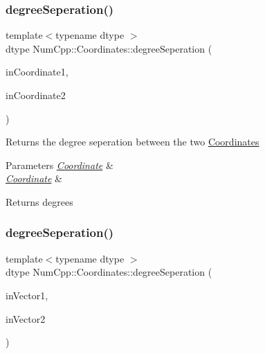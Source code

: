 \subsubsection{\texorpdfstring{degree\+Seperation()}{degreeSeperation()}\hspace{0.1cm}{\footnotesize\ttfamily [1/2]}}
{\footnotesize\ttfamily template$<$typename dtype $>$ \\
dtype Num\+Cpp\+::\+Coordinates\+::degree\+Seperation (\begin{DoxyParamCaption}\item[{const \mbox{\hyperlink{class_num_cpp_1_1_coordinates_1_1_coordinate}{Coordinate}}$<$ dtype $>$ \&}]{in\+Coordinate1,  }\item[{const \mbox{\hyperlink{class_num_cpp_1_1_coordinates_1_1_coordinate}{Coordinate}}$<$ dtype $>$ \&}]{in\+Coordinate2 }\end{DoxyParamCaption})}

Returns the degree seperation between the two \mbox{\hyperlink{namespace_num_cpp_1_1_coordinates}{Coordinates}}


\begin{DoxyParams}{Parameters}
{\em \mbox{\hyperlink{class_num_cpp_1_1_coordinates_1_1_coordinate}{Coordinate}}} & \\
\hline
{\em \mbox{\hyperlink{class_num_cpp_1_1_coordinates_1_1_coordinate}{Coordinate}}} & \\
\hline
\end{DoxyParams}
\begin{DoxyReturn}{Returns}
degrees 
\end{DoxyReturn}
\mbox{\label{namespace_num_cpp_1_1_coordinates_a1bd451cf9737de1038420b005b9ccf48}} 
\subsubsection{\texorpdfstring{degree\+Seperation()}{degreeSeperation()}\hspace{0.1cm}{\footnotesize\ttfamily [2/2]}}
{\footnotesize\ttfamily template$<$typename dtype $>$ \\
dtype Num\+Cpp\+::\+Coordinates\+::degree\+Seperation (\begin{DoxyParamCaption}\item[{const \mbox{\hyperlink{class_num_cpp_1_1_nd_array}{Nd\+Array}}$<$ dtype $>$ \&}]{in\+Vector1,  }\item[{const \mbox{\hyperlink{class_num_cpp_1_1_nd_array}{Nd\+Array}}$<$ dtype $>$ \&}]{in\+Vector2 }\end{DoxyParamCaption})}

